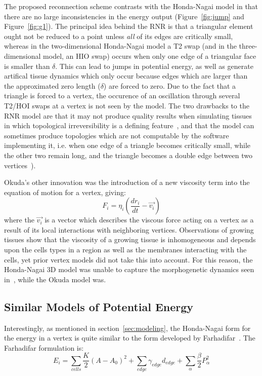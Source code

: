 The proposed reconnection scheme contrasts with the Honda-Nagai model in that there are no large inconsistencies in the energy output (Figure~\ref{fig:jump} and Figure~\ref{fig:g1}). The principal idea behind the RNR is that a triangular element ought not be reduced to a point unless \emph{all} of its edges are critically small, whereas in the two-dimensional Honda-Nagai model a T2 swap (and in the three-dimensional model, an HIO swap) occurs when only one edge of a triangular face is smaller than $\delta$. This can lead to jumps in potential energy, as well as generate artifical tissue dynamics which only occur because edges which are larger than the approximated zero length ($\delta$) are forced to zero. Due to the fact that a triangle is forced to a vertex, the occurence of an oscillation through several T2/HOI swaps at a vertex is not seen by the model. The two drawbacks to the RNR model are that it may not produce quality results when simulating tissues in which topological irreversibility is a defining feature~\cite{CellSurf}, and that the model can sometimes produce topologies which are not computable by the software implementing it, i.e. when one edge of a triangle becomes critically small, while the other two remain long, and the triangle becomes a double edge between two vertices~\cite{Okuda3}).

Okuda's other innovation was the introduction of a new viscosity term into the equation of motion for a vertex, giving:
\begin{equation}
F_i = \eta_i(\frac{dr_i}{dt} - \vec{v_i})
\end{equation}
where the $\vec{v_i}$ is a vector which describes the viscous force acting on a vertex as a result of its local interactions with neighboring vertices. Observations of growing tissues show that the viscosity of a growing tissue is inhomogeneous and depends upon the cells types in a region as well as the membranes interacting with the cells, yet prior vertex models did not take this into account. For this reason, the Honda-Nagai 3D model was unable to capture the morphogenetic dynamics seen in~\cite{Mao}, while the Okuda model was.


\subsection{Similar Models of Potential Energy}
Interestingly, as mentioned in section~\ref{sec:modeling}, the Honda-Nagai form for the energy in a vertex is quite similar to the form developed by Farhadifar~\cite{Farhadifar}. The Farhadifar formulation is:
\begin{equation}
E_i = \sum\limits_{cells}\frac K2(A - A_0)^2 + \sum\limits_{edge}\gamma_{edge}d_{edge} + \sum\limits_{\alpha}\frac\beta2P_\alpha^2
\end{equation}


